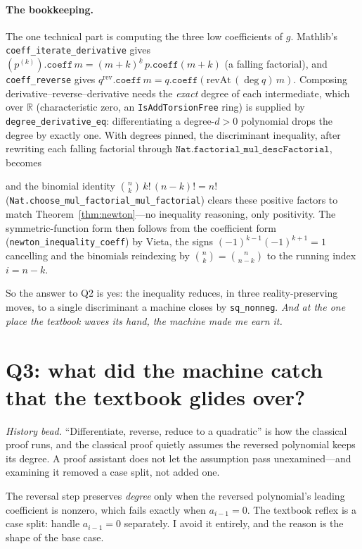 \documentclass[11pt]{article}
\newcommand{\lean}[1]{\texttt{#1}}
\newcommand{\R}{\mathbb{R}}
\newcommand{\keyeq}[1]{\begin{center}\keybox{$\displaystyle #1$}\end{center}}
\begin{document}
\paragraph{The bookkeeping.} The one technical part is computing the three low coefficients of
$g$. Mathlib's \lean{coeff\_iterate\_derivative} gives $(p^{(k)}).\mathtt{coeff}\,m=
(m{+}k)^{\underline{k}}\,p.\mathtt{coeff}(m{+}k)$ (a falling factorial), and \lean{coeff\_reverse}
gives $q^{\mathrm{rev}}.\mathtt{coeff}\,m=q.\mathtt{coeff}(\mathrm{revAt}\,(\deg q)\,m)$.
Composing derivative--reverse--derivative needs the \emph{exact} degree of each intermediate,
which over $\R$ (characteristic zero, an \lean{IsAddTorsionFree} ring) is supplied by
\lean{degree\_derivative\_eq}: differentiating a degree-$d{>}0$ polynomial drops the degree by
exactly one. With degrees pinned, the discriminant inequality, after rewriting each falling
factorial through $\lean{Nat.factorial\_mul\_descFactorial}$, becomes
\keyeq{\bigl((N-1)!\,i!\bigr)^2\,a_i^2\;\ge\;N!\,(N-2)!\,(i-1)!\,(i+1)!\;a_{i-1}a_{i+1},}
and the binomial identity $\binom{n}{k}\,k!\,(n-k)!=n!$
(\lean{Nat.choose\_mul\_factorial\_mul\_factorial}) clears these positive factors to match
Theorem~\ref{thm:newton}---no inequality reasoning, only positivity. The symmetric-function form
then follows from the coefficient form (\lean{newton\_inequality\_coeff}) by Vieta, the signs
$(-1)^{k-1}(-1)^{k+1}=1$ cancelling and the binomials reindexing by
$\binom{n}{k}=\binom{n}{n-k}$ to the running index $i=n-k$.

So the answer to Q2 is yes: the inequality reduces, in three reality-preserving moves, to a single
discriminant a machine closes by \lean{sq\_nonneg}. \emph{And at the one place the textbook waves
its hand, the machine made me earn it.}

\section{Q3: what did the machine catch that the textbook glides over?}\label{sec:caught}

\emph{History bead.} ``Differentiate, reverse, reduce to a quadratic'' is how the classical proof
runs, and the classical proof quietly assumes the reversed polynomial keeps its degree. A proof
assistant does not let the assumption pass unexamined---and examining it removed a case split, not
added one.

The reversal step preserves \emph{degree} only when the reversed polynomial's leading coefficient
is nonzero, which fails exactly when $a_{i-1}=0$. The textbook reflex is a case split: handle
$a_{i-1}=0$ separately. I avoid it entirely, and the reason is the shape of the base case.
\end{document}
